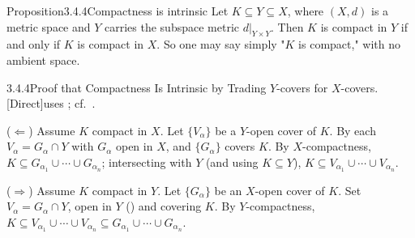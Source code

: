 \documentclass[main.tex]{subfiles}
\begin{document}
\begin{Obj}{Proposition}{3.4.4}{Compactness is intrinsic}
Let $K\subseteq Y\subseteq X$, where $(X,d)$ is a metric space and $Y$ carries the subspace metric
$d|_{Y\times Y}$. Then $K$ is compact in $Y$ if
and only if $K$ is compact in $X$. So one may say simply "$K$ is compact," with no ambient space.
\end{Obj}
\begin{Prf}{3.4.4}{Proof that Compactness Is Intrinsic by Trading $Y$-covers for $X$-covers.}{[Direct]\quad uses ; cf.\ .}
\item ($\Leftarrow$) Assume $K$ compact in $X$. Let $\{V_\alpha\}$ be a $Y$-open cover of $K$. By
   each $V_\alpha=G_\alpha\cap Y$ with $G_\alpha$ open in $X$, and $\{G_\alpha\}$ covers
  $K$. By $X$-compactness, $K\subseteq G_{\alpha_1}\cup\cdots\cup G_{\alpha_n}$; intersecting with $Y$
  (and using $K\subseteq Y$), $K\subseteq V_{\alpha_1}\cup\cdots\cup V_{\alpha_n}$.
\item ($\Rightarrow$) Assume $K$ compact in $Y$. Let $\{G_\alpha\}$ be an $X$-open cover of $K$. Set
  $V_\alpha=G_\alpha\cap Y$, open in $Y$ () and covering $K$. By $Y$-compactness,
  $K\subseteq V_{\alpha_1}\cup\cdots\cup V_{\alpha_n}\subseteq G_{\alpha_1}\cup\cdots\cup G_{\alpha_n}$.
\end{Prf}

\ifSubfilesClassLoaded{\clearpage\objindex}{}
\end{document}
